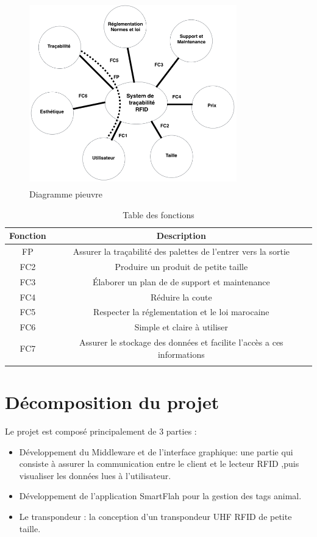 \documentclass[11pt, a4paper, twoside]{book}
\begin{document}
\begin{figure}[H]
\centering
\includegraphics[width=9cm,height=8cm]{pieuvre}
\caption{Diagramme pieuvre}
\end{figure}


\begin{longtable}{|c|c|}
\hline
\textbf{Fonction} & \textbf{Description} \\
\hline
FP & Assurer la traçabilité des palettes de l'entrer vers la sortie  \\
\hline
FC2 & Produire un produit de petite taille  \\
\hline
FC3 & Élaborer un plan de de support et maintenance  \\
\hline
FC4 & Réduire la coute   \\
\hline
FC5 & Respecter la réglementation et le loi marocaine \\
\hline
FC6 & Simple et claire à utiliser \\
\hline
FC7 & Assurer le stockage des données et facilite l'accès a ces informations \\
\hline
\caption{Table des fonctions}
\end{longtable}



\section{Décomposition du projet}
Le projet est composé principalement de 3 parties :
\begin{itemize}
\item Développement du Middleware et de l'interface graphique: une partie qui consiste à assurer la communication entre le client et le lecteur RFID ,puis visualiser les données lues à l'utilisateur.
\item Développement de l'application SmartFlah pour la gestion des tags animal.
\item Le transpondeur : la conception d'un transpondeur UHF RFID de petite taille.\\
\end{itemize}
\end{document}
